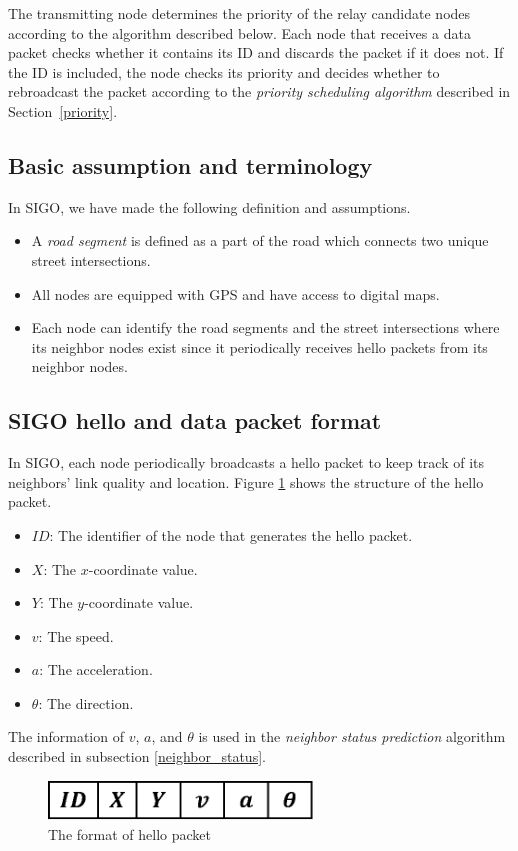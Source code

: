 \documentclass[conference]{IEEEtran}
\begin{document}
The transmitting node determines the priority of the relay candidate nodes according to the algorithm described 
below. Each node that receives a data packet checks whether it contains its ID and discards the packet if it does not. If the ID is included, the node checks its priority and decides whether to rebroadcast the packet according to the \textit{priority scheduling algorithm} described in \mbox{Section \ref{priority}}.

\subsection{Basic assumption and terminology}
In SIGO, we have made the following definition and assumptions.
\begin{itemize}
\item A \textit{road segment} is defined as a part of the road which connects two unique street intersections.
\item All nodes are equipped with GPS and have access to digital maps.
\item Each node can identify the road segments and the street intersections where its neighbor nodes exist since it
periodically receives hello packets from its neighbor nodes.
\end{itemize}


\subsection{SIGO hello and data packet format}
In SIGO, each node periodically broadcasts a hello packet to keep track of its neighbors' link quality and location.  Figure \ref{fig:hellopacket} shows the structure of the hello packet.

\begin{itemize}
\item $ID$: The identifier of the node that generates the hello packet.
\item $X$: The $x$-coordinate value.
\item $Y$: The $y$-coordinate value.
\item $v$: The speed.
\item $a$: The acceleration.
\item $\theta$: The direction.
\end{itemize}
The information of  $v$, $a$, and $\theta$ is used in the \textit{neighbor status prediction} algorithm described in subsection \ref{neighbor_status}.

\begin{figure}[!ht]
\centering
\includegraphics[width=70mm]{figures/Hellopacket_format.eps}
\caption{The format of hello packet}
\label{fig:hellopacket}
\end{figure}
\end{document}
